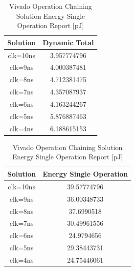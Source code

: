 \begin{table}[H]
    \centering
    \begin{minipage}[t]{0.45\linewidth}
        \centering
        \begin{tabular}{|c|c|}
            \hline
            \textbf{Solution} & \textbf{Dynamic Total} \\
            \hline
            clk=10ns & 3.957774796 \\
            \hline
            clk=9ns & 4.000387481 \\
            \hline
            clk=8ns & 4.712381475 \\
            \hline
            clk=7ns & 4.357087937 \\
            \hline
            clk=6ns & 4.163244267 \\
            \hline
            clk=5ns & 5.876887463 \\
            \hline
            clk=4ns & 6.188615153 \\
            \hline
        \end{tabular}
        \caption{Vivado Operation Chaining Solution Dynamic Power Report [mW]}
        \label{tab:vivado-operation-chaining-solution-dynamic-power-reproot}
    \end{minipage}
    \hfill
    \centering
    \begin{minipage}[t]{0.45\linewidth}
        \centering
        \begin{tabular}{|c|c|}
            \hline
            \textbf{Solution} & \textbf{Energy Single Operation} \\
            \hline
            clk=10ns & 39.57774796 \\
            \hline
            clk=9ns & 36.00348733 \\
            \hline
            clk=8ns & 37.6990518 \\
            \hline
            clk=7ns & 30.49961556 \\
            \hline
            clk=6ns & 24.9794656 \\
            \hline
            clk=5ns & 29.38443731 \\
            \hline
            clk=4ns & 24.75446061 \\
            \hline
        \end{tabular}
        \caption{Vivado Operation Chaining Solution Energy Single Operation Report [pJ]}
        \label{tab:vivado-operation-chaining-solution-solution-energy-single-operation-reproot}
    \end{minipage}
\end{table}


